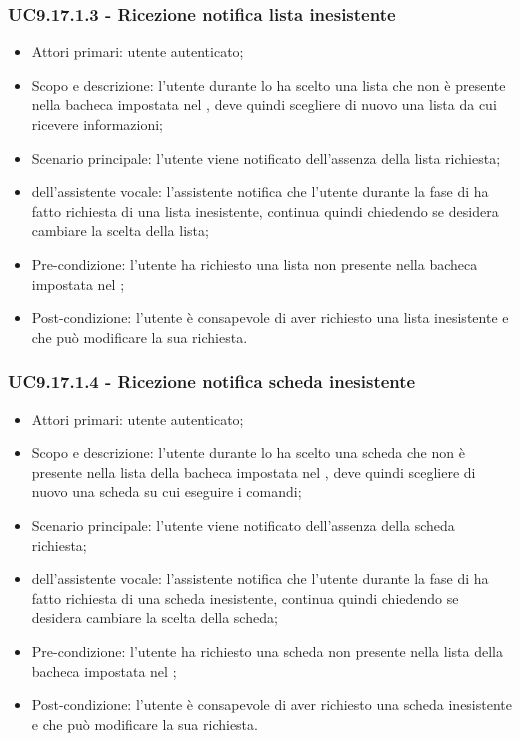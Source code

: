 \subsubsection{UC9.17.1.3 - Ricezione notifica lista inesistente}
\begin{itemize}
	\item  Attori primari: utente autenticato;
	\item  Scopo e descrizione: l'utente durante lo  ha scelto una lista che non è presente nella bacheca impostata nel , deve quindi scegliere di nuovo una lista da cui ricevere informazioni;
	\item  Scenario principale: l'utente viene notificato dell'assenza della lista richiesta;
	\item  {} dell'assistente vocale: l'assistente notifica che l'utente durante la fase di  ha fatto richiesta di una lista inesistente, continua quindi chiedendo se desidera cambiare la scelta della lista;
	\item  Pre-condizione: l'utente ha richiesto una lista non presente nella bacheca impostata nel ;
	\item  Post-condizione: l'utente è consapevole di aver richiesto una lista inesistente e che può modificare la sua richiesta.
\end{itemize}
\subsubsection{UC9.17.1.4 - Ricezione notifica scheda inesistente}
\begin{itemize}
	\item  Attori primari: utente autenticato;
	\item  Scopo e descrizione: l'utente durante lo  ha scelto una scheda che non è presente nella lista della bacheca impostata nel , deve quindi scegliere di nuovo una scheda su cui eseguire i comandi;
	\item  Scenario principale: l'utente viene notificato dell'assenza della scheda richiesta;
	\item  {} dell'assistente vocale: l'assistente notifica che l'utente durante la fase di  ha fatto richiesta di una scheda inesistente, continua quindi chiedendo se desidera cambiare la scelta della scheda;
	\item  Pre-condizione: l'utente ha richiesto una scheda non presente nella lista della bacheca impostata nel ;
	\item  Post-condizione: l'utente è consapevole di aver richiesto una scheda inesistente e che può modificare la sua richiesta.
\end{itemize}

